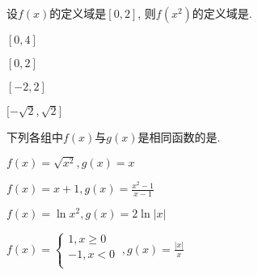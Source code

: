 		
		\begin{problem}
			设$f\left( x \right)$的定义域是$\left\lbrack 0,2 \right\rbrack$, 则$f\left( x^{2} \right)$的定义域是.
			
			
			\begin{abcd} \item $\left\lbrack 0,4 \right\rbrack$
				
				\item $\left\lbrack 0,2 \right\rbrack$
				
				\item $\left\lbrack - 2,2 \right\rbrack$
				
				\item $\lbrack - \sqrt{2},\sqrt{2}\rbrack$
				\end{abcd}
				
		\end{problem}
				
				\begin{problem}
					下列各组中$f\left( x \right)$与$g\left( x \right)$是相同函数的是\pickin{C}.
					
					
					\begin{abcd} \item $f\left( x \right) = \sqrt{x^{2}}, g\left( x \right) = x$
						
						\item
						$f\left( x \right) = x + 1, g\left( x \right) = \frac{x^{2} - 1}{x - 1}$
						
						\item $f\left( x \right) = \ln x^{2}, g\left( x \right) = 2\ln|x|$
						
						\item $f\left( x \right) = \left\{ \begin{matrix}
						1,x \geq 0 \\
						-1,x < 0 \\
						\end{matrix} \right.\ ,g\left( x \right) = \frac{|x|}{x}$
						
				\end{abcd}  \end{problem}
				
